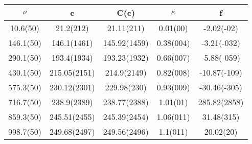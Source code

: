 \begin{table}[H]
	\centering
	\begin{tabular}{ccccc}
		$\nu$ & c & C(c) & $\kappa$ & f\\
		\hline
		10.6(50) & 21.2(212) & 21.11(211) & 0.01(00) & -2.02(-02)	\\
		146.1(50) & 146.1(1461) & 145.92(1459) & 0.38(004) & -3.21(-032)	\\
		290.1(50) & 193.4(1934) & 193.23(1932) & 0.66(007) & -5.88(-059)	\\
		430.1(50) & 215.05(2151) & 214.9(2149) & 0.82(008) & -10.87(-109)	\\
		575.3(50) & 230.12(2301) & 229.98(230) & 0.93(009) & -30.46(-305)	\\
		716.7(50) & 238.9(2389) & 238.77(2388) & 1.01(01) & 285.82(2858)	\\
		859.3(50) & 245.51(2455) & 245.39(2454) & 1.06(011) & 31.48(315)	\\
		998.7(50) & 249.68(2497) & 249.56(2496) & 1.1(011) & 20.02(20)	\\
	\end{tabular}
\end{table}
